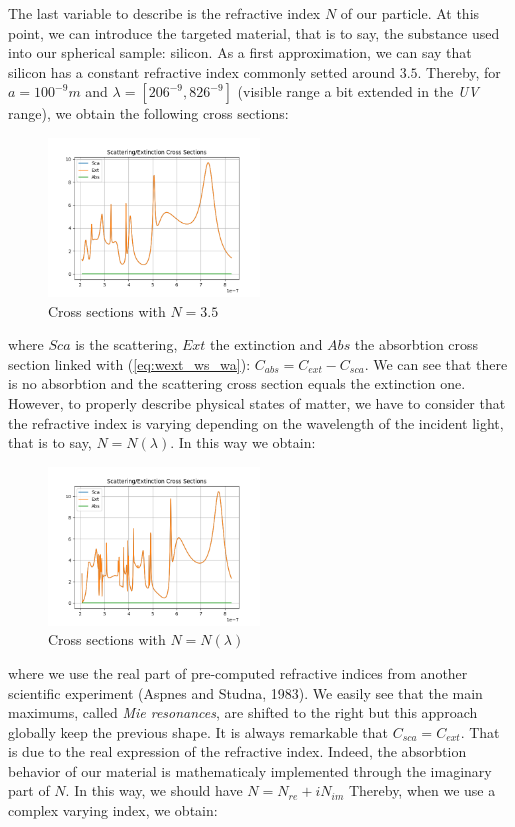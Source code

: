 \documentclass{article}
\numberwithin{equation}{section}
\begin{document}
The last variable to describe is the refractive index $N$ of our particle. At this point, we can introduce the targeted material, that is to say, the substance used into our spherical sample: silicon. As a first approximation, we can say that silicon has a constant refractive index commonly setted around $3.5$. Thereby, for $a=100^{-9}m$ and $\lambda=[206^{-9}, 826^{-9}]$ (visible range a bit extended in the \textit{UV} range), we obtain the following cross sections:
\begin{figure}[h]
    \centering
    \includegraphics[width=0.5\textwidth, height=0.4\textwidth]{ri_const.png}
    \caption{Cross sections with $N=3.5$}
\end{figure}
where $Sca$ is the scattering, $Ext$ the extinction and $Abs$ the absorbtion cross section linked with (\ref{eq:wext_ws_wa}): $C_{abs} = C_{ext} - C_{sca}$. We can see that there is no absorbtion and the scattering cross section equals the extinction one. However, to properly describe physical states of matter, we have to consider that the refractive index is varying depending on the wavelength of the incident light, that is to say, $N=N(\lambda)$. In this way we obtain:
\begin{figure}[h]
    \centering
    \includegraphics[width=0.5\textwidth, height=0.4\textwidth]{ri_var_real.png}
    \caption{Cross sections with $N=N(\lambda)$}
\end{figure}
where we use the real part of pre-computed refractive indices from another scientific experiment (Aspnes and Studna, 1983). We easily see that the main maximums, called \textit{Mie resonances}, are shifted to the right but this approach globally keep the previous shape. It is always remarkable that $C_{sca}=C_{ext}$. That is due to the real expression of the refractive index. Indeed, the absorbtion behavior of our material is mathematicaly implemented through the imaginary part of $N$. In this way, we should have $N=N_{re}+iN_{im}$ Thereby, when we use a complex varying index, we obtain:
\end{document}

